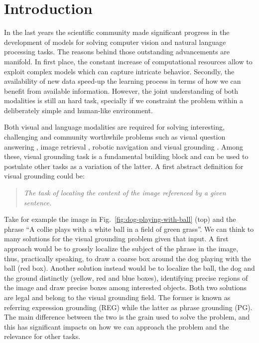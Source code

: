 \chapter{Introduction}
\label{ch:intro}

In the last years the scientific community made significant progress
in the development of models for solving computer vision and natural
language processing tasks. The reasons behind those outstanding
advancements are manifold. In first place, the constant increase of
computational resources allow to exploit complex models which can
capture intricate behavior. Secondly, the availability of new data
speed-up the learning process in terms of how we can benefit from
available information. However, the joint understanding of both
modalities is still an hard task, specially if we constraint the
problem within a deliberately simple and human-like environment.

Both visual and language modalities are required for solving
interesting, challenging and community worthwhile problems such as
visual question answering \cite{kafle2017visual}, image retrieval
\cite{gordo2016deep, radenovic2016cnn}, robotic navigation
\cite{thomason2017guiding} and visual grounding
\cite{plummer2015flickr30k,datta2019align2ground,wang2019phrase,wang2020maf,rigoni2021better}.
Among these, visual grounding task is a fundamental building block and
can be used to postulate other tasks as a variation of the latter. A
first abstract definition for visual grounding could be:

\begin{quote}
    \textit{The task of locating the content of the image referenced
    by a given sentence.}
\end{quote}

Take for example the image in Fig.~\ref{fig:dog-playing-with-ball}
(top) and the phrase ``A collie plays with a white ball in a field of
green grass''. We can think to many solutions for the visual grounding
problem given that input. A first approach would be to grossly
localize the subject of the phrase in the image, thus, practically
speaking, to draw a coarse box around the dog playing with the ball
(red box). Another solution instead would be to localize the ball, the
dog and the ground distinctly (yellow, red and blue boxes),
identifying precise regions of the image and draw precise boxes among
interested objects. Both two solutions are legal and belong to the
visual grounding field. The former is known as referring expression
grounding (REG) while the latter as phrase grounding (PG). The main
difference between the two is the grain used to solve the problem, and
this has significant impacts on how we can approach the problem and
the relevance for other tasks.

